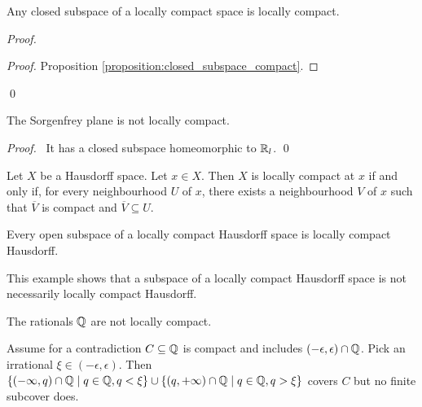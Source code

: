 \begin{proposition}
    \label{proposition:closed_subspace_locally_compact}
    Any closed subspace of a locally compact space is locally compact.
\end{proposition}

\begin{proof}
    \pf
    \begin{proof}
        \pf Proposition \ref{proposition:closed_subspace_compact}.
    \end{proof}
    \qed
\end{proof}

\begin{corollary}
    The Sorgenfrey plane is not locally compact.
\end{corollary}

\begin{proof}
    \pf\ It has a closed subspace homeomorphic to $\mathbb{R}_l$. \qed
\end{proof}

\begin{proposition}
    \label{proposition:locally_compact_neighbourhood}
    Let $X$ be a Hausdorff space. Let $x \in X$. Then $X$ is locally compact at $x$ if and only if,
    for every neighbourhood $U$ of $x$, there exists a neighbourhood $V$ of $x$ such that
    $\overline{V}$ is compact and $\overline{V} \subseteq U$.
\end{proposition}

\begin{corollary}
    Every open subspace of a locally compact Hausdorff space is locally compact Hausdorff.
\end{corollary}

This example shows that a subspace of a locally compact Hausdorff space is not necessarily locally
compact Hausdorff.

\begin{example}
    The rationals $\mathbb{Q}$ are not locally compact.

    Assume for a contradiction $C \subseteq \mathbb{Q}$ is compact and includes $(-\epsilon, \epsilon)
    \cap \mathbb{Q}$. Pick an irrational $\xi \in (- \epsilon, \epsilon)$. Then $\{ (-\infty, q) \cap
    \mathbb{Q} \mid q \in \mathbb{Q}, q < \xi \} \cup \{ (q, +\infty) \cap
    \mathbb{Q} \mid q \in \mathbb{Q}, q > \xi \}$ covers $C$ but no finite subcover does.
\end{example}

